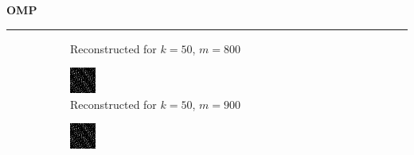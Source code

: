 \documentclass[a4paper,12pt]{article}
\newenvironment{solution}[2][]{%
    \begin{mdframed}[linecolor=blue!70!black, linewidth=2pt, roundcorner=10pt, backgroundcolor=yellow!10!white, skipabove=12pt, skipbelow=12pt]%
        \textbf{\large #2}
        \par\noindent\rule{\textwidth}{0.4pt}
}{
    \end{mdframed}
}
\begin{document}
\begin{solution}{OMP}
\begin{figure}[H]
\begin{subfigure}[t]{0.23\textwidth}
        \caption{Reconstructed for $k = 50$, $m = 800$}
    \end{subfigure}
    \begin{subfigure}[t]{0.23\textwidth}
        \centering
        \includegraphics[width=\textwidth]{../images/omp/Reconstructed_k_50_m_900.png}
        \caption{Reconstructed for $k = 50$, $m = 900$}
    \end{subfigure}
    \begin{subfigure}[t]{0.23\textwidth}
        \centering
        \includegraphics[width=\textwidth]{../images/omp/Reconstructed_k_50_m_1000.png}

\end{subfigure}
\end{figure}
\end{solution}
\end{document}
